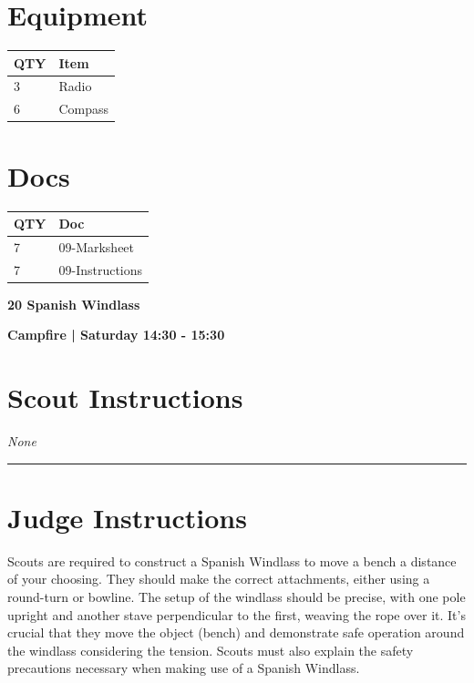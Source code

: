 \documentclass[10pt]{article}
\newcommand{\newtitle}[1]{\begin{center}{\Huge\bfseries #1 }\\ \vspace{5mm}\end{center}}
\newcommand{\newsubtitle}[1]{\begin{center}{\color{grey}\Large\bfseries #1 }\\ \vspace{5mm}\end{center}}
\begin{document}
	\begin{multicols}{2}

		\section*{\faWrench \: Equipment}

		
	\begin{center}
			\begin{tabular}{p{2cm}p{4cm}}


				\textbf{QTY} & \textbf{Item} \\\toprule
												3&Radio\\\midrule
												6&Compass\\\midrule
								\end{tabular}

			\end{center}

		
		\vfill\null
		\columnbreak

			\section*{\faFile \: Docs}
		 	\begin{center}
			\begin{tabular}{p{2cm}p{4cm}}

			\textbf{QTY} & \textbf{Doc} \\\toprule
										7&09-Marksheet\\\midrule
										7&09-Instructions\\\midrule
							\end{tabular}
			\end{center}
	

		\vfill\null

		\end{multicols}



	\vspace{1cm}


	\clearpage
		\newtitle{20 Spanish Windlass }
	\newsubtitle{Campfire | Saturday 14:30 - 15:30}
		\setcounter{section}{19}
	\section*{Scout Instructions}
		\textit{None}
	
	\vspace{0.5cm}
	\hrule
	\vspace{0.5cm}

		\section*{Judge Instructions}
		Scouts are required to construct a Spanish Windlass to move a bench a distance of your choosing. They should make the correct attachments, either using a round-turn or bowline. The setup of the windlass should be precise, with one pole upright and another stave perpendicular to the first, weaving the rope over it. It's crucial that they move the object (bench) and demonstrate safe operation around the windlass considering the tension. Scouts must also explain the safety precautions necessary when making use of a Spanish Windlass.
\end{document}
